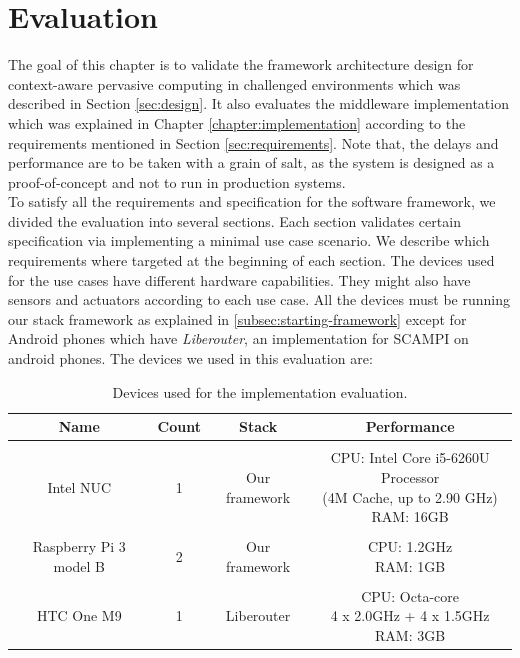 
\chapter{Evaluation}\label{chapter:Evaluation}

The goal of this chapter is to validate the framework architecture design for context-aware pervasive computing in challenged environments which was described in Section \ref{sec:design}. It also evaluates the middleware implementation which was explained in Chapter \ref{chapter:implementation} according to the requirements mentioned in Section \ref{sec:requirements}. Note that, the delays and performance are to be taken with a grain of salt, as the system is designed as a proof-of-concept and not to run in production systems. \\

\noindent To satisfy all the requirements and specification for the software framework, we divided the evaluation into several sections. Each section validates certain specification via implementing a minimal use case scenario. We describe which requirements where targeted at the beginning of each section. The devices used for  the use cases have different hardware capabilities. They might also have  sensors and actuators according to each use case. All the devices must be running our stack framework as explained in \ref{subsec:starting-framework} except for Android phones which have \textit{Liberouter}, an implementation for SCAMPI on android phones. The devices we used in this evaluation are:
\begin{table}[!ht]
	\centering
	\begin{tabular}{*{4}{c}}\toprule
		Name & Count & Stack & Performance \\ \hline
		 &  &  &  \\
		Intel NUC &1& 	Our framework &   \specialcell[c]{CPU: Intel Core i5-6260U Processor\\ (4M Cache, up to 2.90 GHz)\\RAM: 16GB }\\ 
		&  &  &  \\
		Raspberry Pi 3 model B & 2 & Our framework &  \specialcell[c]{ CPU: 1.2GHz\\RAM: 1GB}  \\ 
		&  &  &  \\
		HTC One M9 & 1 & Liberouter &   \specialcell[c]{CPU: Octa-core \\4 x 2.0GHz + 4 x 1.5GHz\\ RAM: 3GB} \\ \hline

\end{tabular}
\caption{Devices used for the implementation evaluation.}
\label{table:devoces}
\end{table}

